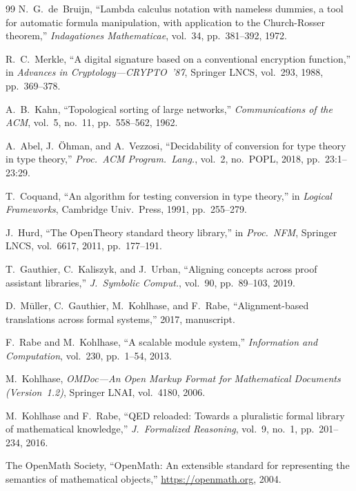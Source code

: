\begin{thebibliography}{99}
  N.~G.~de~Bruijn,
  ``Lambda calculus notation with nameless dummies, a tool for
  automatic formula manipulation, with application to the
  Church-Rosser theorem,''
  \emph{Indagationes Mathematicae}, vol.~34, pp.~381--392, 1972.

  R.~C.~Merkle,
  ``A digital signature based on a conventional encryption function,''
  in \emph{Advances in Cryptology---CRYPTO~'87}, Springer LNCS,
  vol.~293, 1988, pp.~369--378.

  A.~B.~Kahn,
  ``Topological sorting of large networks,''
  \emph{Communications of the ACM}, vol.~5, no.~11, pp.~558--562, 1962.

  A.~Abel, J.~\"{O}hman, and A.~Vezzosi,
  ``Decidability of conversion for type theory in type theory,''
  \emph{Proc.\ ACM Program.\ Lang.}, vol.~2, no.~POPL, 2018,
  pp.~23:1--23:29.

  T.~Coquand,
  ``An algorithm for testing conversion in type theory,''
  in \emph{Logical Frameworks}, Cambridge Univ.\ Press, 1991,
  pp.~255--279.

  J.~Hurd,
  ``The OpenTheory standard theory library,''
  in \emph{Proc.\ NFM}, Springer LNCS, vol.~6617, 2011, pp.~177--191.

  T.~Gauthier, C.~Kaliszyk, and J.~Urban,
  ``Aligning concepts across proof assistant libraries,''
  \emph{J.\ Symbolic Comput.}, vol.~90, pp.~89--103, 2019.

  D.~M\"{u}ller, C.~Gauthier, M.~Kohlhase, and F.~Rabe,
  ``Alignment-based translations across formal systems,''
  2017, manuscript.

  F.~Rabe and M.~Kohlhase,
  ``A scalable module system,''
  \emph{Information and Computation}, vol.~230, pp.~1--54, 2013.

  M.~Kohlhase,
  \emph{OMDoc---An Open Markup Format for Mathematical Documents
  (Version~1.2)},
  Springer LNAI, vol.~4180, 2006.

  M.~Kohlhase and F.~Rabe,
  ``QED reloaded: Towards a pluralistic formal library of mathematical
  knowledge,''
  \emph{J.\ Formalized Reasoning}, vol.~9, no.~1, pp.~201--234, 2016.

  The OpenMath Society,
  ``OpenMath: An extensible standard for representing the semantics of
  mathematical objects,''
  \url{https://openmath.org}, 2004.


\end{thebibliography}
